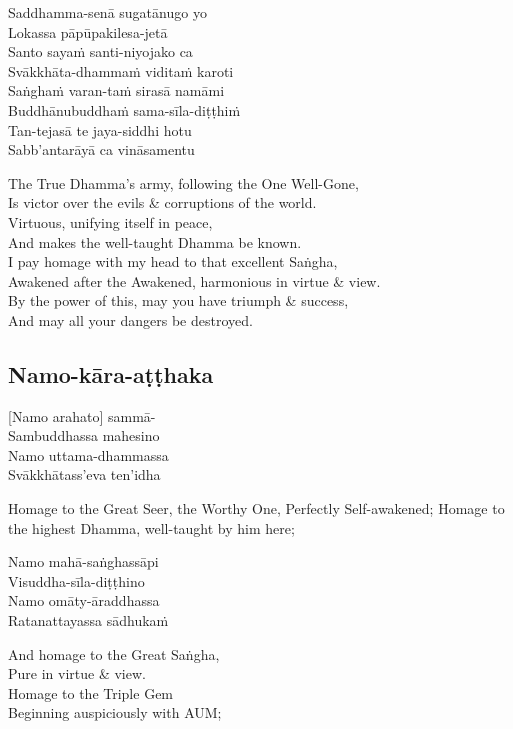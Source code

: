 Saddhamma-senā sugatānugo yo\\
Lokassa pāpūpakilesa-jetā\\
Santo sayaṁ santi-niyojako ca\\
Svākkhāta-dhammaṁ viditaṁ karoti\\
Saṅghaṁ varan-taṁ sirasā namāmi\\
Buddhānubuddhaṁ sama-sīla-diṭṭhiṁ\\
Tan-tejasā te jaya-siddhi hotu\\
Sabb’antarāyā ca vināsamentu

\begin{english}
  The True Dhamma's army, following the One Well-Gone,\\
  Is victor over the evils \& corruptions of the world.\\
  Virtuous, unifying itself in peace,\\
  And makes the well-taught Dhamma be known.\\
  I pay homage with my head to that excellent Saṅgha,\\
  Awakened after the Awakened, harmonious in virtue \& view.\\
  By the power of this, may you have triumph \& success,\\
  And may all your dangers be destroyed.
\end{english}

\suttaRef{[Thai]}

\subsection{Namo-kāra-aṭṭhaka}
[Namo arahato] sammā-\\
Sambuddhassa mahesino\\
Namo uttama-dhammassa\\
Svākkhātass’eva ten’idha

\begin{english}
  Homage to the Great Seer, the Worthy One, Perfectly Self-awakened; Homage to the highest Dhamma, well-taught by him here;
\end{english}

Namo mahā-saṅghassāpi\\
Visuddha-sīla-diṭṭhino\\
Namo omāty-āraddhassa\\
Ratanattayassa sādhukaṁ

\begin{english}
  And homage to the Great Saṅgha,\\
  Pure in virtue \& view.\\
  Homage to the Triple Gem\\
  Beginning auspiciously with AUM;
\end{english}

